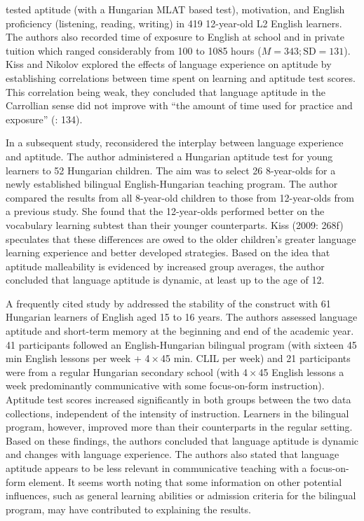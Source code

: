 \documentclass[output=paper]{langsci/langscibook}
\begin{document}
\citet{KissNikolov2005} tested aptitude (with a Hungarian MLAT based test), motivation, and English proficiency (listening, reading, writing) in 419 12-year-old L2 English learners. The authors also recorded time of exposure to English at school and in private tuition which ranged considerably from 100 to 1085 hours ($M= 343; \text{SD}= 131$). Kiss and Nikolov explored the effects of language experience on aptitude by establishing correlations between time spent on learning and aptitude test scores. This correlation being weak, they concluded that language aptitude in the Carrollian sense did not improve with “the amount of time used for practice and exposure” (\citealt{KissNikolov2005}: 134).

In a subsequent study, \citet{Kiss2009} reconsidered the interplay between language experience and aptitude. The author administered a Hungarian aptitude test for young learners to 52 Hungarian children. The aim was to select 26 8-year-olds for a newly established bilingual English-Hungarian teaching program. The author compared the results from all 8-year-old children to those from 12-year-olds from a previous study. She found that the 12-year-olds performed better on the vocabulary learning subtest than their younger counterparts. Kiss (2009: 268f) speculates that these differences are owed to the older children’s greater language learning experience and better developed strategies. Based on the idea that aptitude malleability is evidenced by increased group averages, the author concluded that language aptitude is dynamic, at least up to the age of 12. 

A frequently cited study by \citet{SafarKormos2008} addressed the stability of the construct with 61 Hungarian learners of English aged 15 to 16 years. The authors assessed language aptitude and short-term memory at the beginning and end of the academic year. 41 participants followed an English-Hungarian bilingual program (with sixteen 45 min English lessons per week + 4\,×\,45 min. CLIL per week) and 21 participants were from a regular Hungarian secondary school (with 4\,×\,45 English lessons a week predominantly communicative with some focus-on-form instruction). Aptitude test scores increased significantly in both groups between the two data collections, independent of the intensity of instruction. Learners in the bilingual program, however, improved more than their counterparts in the regular setting. Based on these findings, the authors concluded that language aptitude is dynamic and changes with language experience. The authors also stated that language aptitude appears to be less relevant in communicative teaching with a focus-on-form element. It seems worth noting that some information on other potential influences, such as general learning abilities or admission criteria for the bilingual program, may have contributed to explaining the results. 
\end{document}

